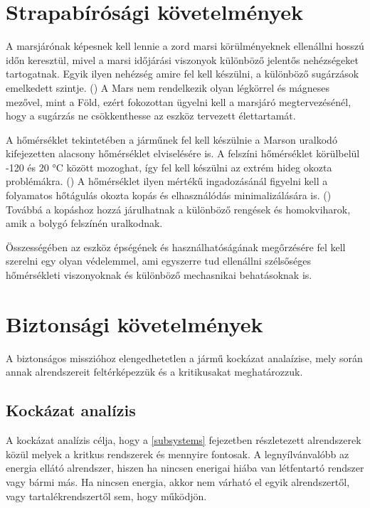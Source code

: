 \documentclass[12pt]{report}
\begin{document}
\section{Strapabírósági követelmények}
A marsjárónak képesnek kell lennie a zord marsi körülményeknek ellenállni hosszú időn keresztül, mivel a marsi időjárási viszonyok különböző jelentős nehézségeket tartogatnak. Egyik ilyen nehézség amire fel kell készülni, a különböző sugárzások emelkedett szintje. () A Mars nem rendelkezik olyan légkörrel és 
mágneses mezővel, mint a Föld, ezért fokozottan ügyelni kell a marsjáró megtervezésénél, hogy a sugárzás ne csökkenthesse az eszköz tervezett élettartamát. 

A hőmérséklet tekintetében a járműnek fel kell készülnie a Marson uralkodó kifejezetten alacsony hőmérséklet elviselésére is. A felszíni hőmérséklet körülbelül  -120 és 20 °C között mozoghat, így fel kell készülni az extrém hideg okozta problémákra. () A hőmérséklet ilyen mértékű ingadozásánál figyelni kell a folyamatos hőtágulás okozta kopás és elhasználódás minimalizálására is. () Továbbá a kopáshoz hozzá járulhatnak a különböző rengések és homokviharok, amik a bolygó felszínén uralkodnak.

Összességében az eszköz épségének és használhatóságának megőrzésére fel kell szerelni egy olyan védelemmel, ami egyszerre tud ellenállni szélsőséges hőmérsékleti viszonyoknak és különböző mechasnikai behatásoknak is.


\section{Biztonsági követelmények}

A biztonságos misszióhoz elengedhetetlen a jármű kockázat analaízise, mely során annak alrendszereit feltérképezzük és a kritikusakat meghatározzuk. 

\subsection{Kockázat analízis}

A kockázat analízis célja, hogy a \ref{subsystems} fejezetben részletezett alrendszerek közül melyek a kritkus rendszerek és mennyire fontosak. A legnyílvánvalóbb az energia ellátó alrendszer, hiszen ha nincsen enerigai hiába van létfentartó rendszer vagy bármi más. Ha nincsen energia, akkor nem várható el egyik alrendszertől, vagy tartalékrendszertől sem, hogy működjön.
\end{document}
